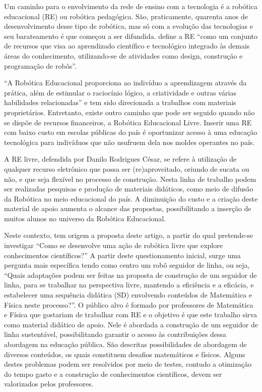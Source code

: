 \documentclass{textolivre-html}
\begin{document}
Um caminho para o envolvimento da rede de ensino com a tecnologia é a robótica
educacional (RE) ou robótica pedagógica. São, praticamente, quarenta anos de
desenvolvimento desse tipo de robótica, mas só com a evolução das tecnologias e
seu barateamento é que começou a ser difundida. \textcite[p. 41]{lopes2008} define a RE
“como um conjunto de recursos que visa ao aprendizado científico e tecnológico
integrado às demais áreas do conhecimento, utilizando-se de atividades como
design, construção e programação de robôs”.

“A Robótica Educacional proporciona ao indivíduo a aprendizagem através da
prática, além de estimular o raciocínio lógico, a criatividade e outras várias
habilidades relacionadas” \cite[p. 76]{silva2016} e
tem sido direcionada a trabalhos com materiais proprietários. Entretanto,
existe outro caminho que pode ser seguido quando não se dispõe de recursos
financeiros, a Robótica Educacional Livre. Inserir uma RE com baixo custo em
escolas públicas do país é oportunizar acesso à uma educação tecnológica para
indivíduos que não usufruem dela nos moldes operantes no país.

A RE livre, defendida por Danilo Rodrigues César, se refere à utilização de
qualquer recurso eletrônico que possa ser (re)aproveitado, oriundo de sucata ou
não, e que seja flexível no processo de construção. Nesta linha de trabalho
podem ser realizadas pesquisas e produção de materiais didáticos, como meio de
difusão da Robótica no meio educacional do país. A diminuição do custo e a
criação deste material de apoio aumenta o alcance das propostas, possibilitando
a inserção de muitos alunos no universo da Robótica Educacional.

Neste contexto, tem origem a proposta deste artigo, a partir do qual
pretende-se investigar “Como se desenvolve uma ação de robótica livre que
explore conhecimentos científicos?” A partir deste questionamento inicial,
surge uma pergunta mais específica tendo como centro um robô seguidor de linha,
ou seja, “Quais adaptações podem ser feitas na proposta de construção de um
seguidor de linha, para se trabalhar na perspectiva livre, mantendo a
eficiência e a eficácia, e estabelecer uma sequência didática (SD) envolvendo
conteúdos de Matemática e Física neste processo?”. O público alvo é formado por
professores de Matemática e Física que gostariam de trabalhar com RE e o
objetivo é que este trabalho sirva como material didático de apoio. Nele é
abordada a construção de um seguidor de linha sustentável, possibilitando
garantir o acesso às contribuições dessa abordagem na educação pública. São
descritas possibilidades de abordagem de diversos conteúdos, os quais
constituem desafios matemáticos e físicos. Alguns destes problemas podem ser
resolvidos por meio de testes, contudo a otimização do tempo gasto e a
construção de conhecimentos científicos, devem ser valorizados pelos
professores.
\end{document}
